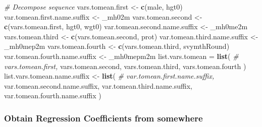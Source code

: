 \documentclass[
]{book}
\newenvironment{Shaded}{\begin{snugshade}}{\end{snugshade}}
\newcommand{\CommentTok}[1]{\textcolor[rgb]{0.56,0.35,0.01}{\textit{#1}}}
\newcommand{\KeywordTok}[1]{\textcolor[rgb]{0.13,0.29,0.53}{\textbf{#1}}}
\newcommand{\NormalTok}[1]{#1}
\newcommand{\StringTok}[1]{\textcolor[rgb]{0.31,0.60,0.02}{#1}}
\begin{document}
\begin{Shaded}
\begin{Highlighting}[]
\CommentTok{\# Decompose sequence}
\NormalTok{vars.tomean.first \textless{}{-}}\StringTok{ }\KeywordTok{c}\NormalTok{(}\StringTok{\textquotesingle{}male\textquotesingle{}}\NormalTok{, }\StringTok{\textquotesingle{}hgt0\textquotesingle{}}\NormalTok{)}
\NormalTok{var.tomean.first.name.suffix \textless{}{-}}\StringTok{ \textquotesingle{}\_mh02m\textquotesingle{}}
\NormalTok{vars.tomean.second \textless{}{-}}\StringTok{ }\KeywordTok{c}\NormalTok{(vars.tomean.first, }\StringTok{\textquotesingle{}hgt0\textquotesingle{}}\NormalTok{, }\StringTok{\textquotesingle{}wgt0\textquotesingle{}}\NormalTok{)}
\NormalTok{var.tomean.second.name.suffix \textless{}{-}}\StringTok{ \textquotesingle{}\_mh0me2m\textquotesingle{}}
\NormalTok{vars.tomean.third \textless{}{-}}\StringTok{ }\KeywordTok{c}\NormalTok{(vars.tomean.second, }\StringTok{\textquotesingle{}prot\textquotesingle{}}\NormalTok{)}
\NormalTok{var.tomean.third.name.suffix \textless{}{-}}\StringTok{ \textquotesingle{}\_mh0mep2m\textquotesingle{}}
\NormalTok{vars.tomean.fourth \textless{}{-}}\StringTok{ }\KeywordTok{c}\NormalTok{(vars.tomean.third, }\StringTok{\textquotesingle{}svymthRound\textquotesingle{}}\NormalTok{)}
\NormalTok{var.tomean.fourth.name.suffix \textless{}{-}}\StringTok{ \textquotesingle{}\_mh0mepm2m\textquotesingle{}}
\NormalTok{list.vars.tomean =}\StringTok{ }\KeywordTok{list}\NormalTok{(}
\CommentTok{\#                         vars.tomean.first,}
\NormalTok{                        vars.tomean.second,}
\NormalTok{                        vars.tomean.third,}
\NormalTok{                        vars.tomean.fourth}
\NormalTok{                        )}
\NormalTok{list.vars.tomean.name.suffix \textless{}{-}}\StringTok{ }\KeywordTok{list}\NormalTok{(}
\CommentTok{\#                                     var.tomean.first.name.suffix,}
\NormalTok{                                     var.tomean.second.name.suffix,}
\NormalTok{                                     var.tomean.third.name.suffix,}
\NormalTok{                                     var.tomean.fourth.name.suffix}
\NormalTok{                                    )}
\end{Highlighting}
\end{Shaded}

\hypertarget{obtain-regression-coefficients-from-somewhere}{%
\subsubsection{Obtain Regression Coefficients from somewhere}\label{obtain-regression-coefficients-from-somewhere}}
\end{document}
